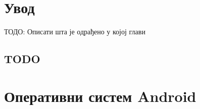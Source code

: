 \documentclass[12pt,oneside]{memoir}
\begin{document}
\frontmatter
\naslovna
\komisija
\posveta{}
\apstrakt
\tableofcontents*

\mainmatter

\chapter{Увод}
ТОДО: Описати шта је одрађено у којој глави

\section{TODO}




\chapter{Оперативни систем Android}



\end{document}
